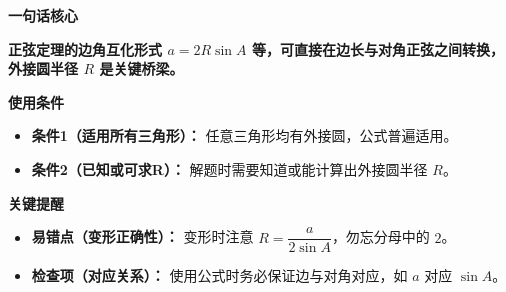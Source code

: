 \begin{summarybox}
	\textbf{\textcolor{CSummary}{一句话核心}}

	\textbf{正弦定理的边角互化形式 $a=2R\sin A$ 等，可直接在边长与对角正弦之间转换，外接圆半径 $R$ 是关键桥梁。}

	\medskip
	\textbf{\textcolor{CSummary}{使用条件}}
	\begin{itemize}[leftmargin=*, itemsep=0.5em, topsep=0.4em]
		\item \textbf{条件1（适用所有三角形）：} 任意三角形均有外接圆，公式普遍适用。
		\item \textbf{条件2（已知或可求R）：} 解题时需要知道或能计算出外接圆半径 $R$。
	\end{itemize}

	\medskip
	\textbf{\textcolor{CSummary}{关键提醒}}
	\begin{itemize}[leftmargin=*, itemsep=0.5em, topsep=0.4em]
		\item \textbf{易错点（变形正确性）：} 变形时注意 $R=\dfrac{a}{2\sin A}$，勿忘分母中的 $2$。
		\item \textbf{检查项（对应关系）：} 使用公式时务必保证边与对角对应，如 $a$ 对应 $\sin A$。
	\end{itemize}
\end{summarybox}
